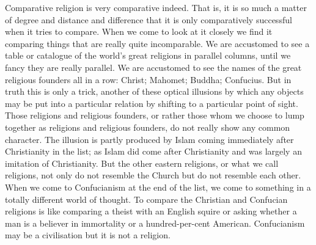 Comparative religion is very comparative indeed. That is, it is so much a matter of degree and distance and difference that it is only comparatively successful when it tries to compare. When we come to look at it closely we find it comparing things that are really quite incomparable. We are accustomed to see a table or catalogue of the world's great religions in parallel columns, until we fancy they are really parallel. We are accustomed to see the names of the great religious founders all in a row: Christ; Mahomet; Buddha; Confucius. But in truth this is only a trick, another of these optical illusions by which any objects may be put into a particular relation by shifting to a particular point of sight. Those religions and religious founders, or rather those whom we choose to lump together as religions and religious founders, do not really show any common character. The illusion is partly produced by Islam coming immediately after Christianity in the list; as Islam did come after Christianity and was largely an imitation of Christianity. But the other eastern religions, or what we call religions, not only do not resemble the Church but do not resemble each other. When we come to Confucianism at the end of the list, we come to something in a totally different world of thought. To compare the Christian and Confucian religions is like comparing a theist with an English squire or asking whether a man is a believer in immortality or a hundred-per-cent American. Confucianism may be a civilisation but it is not a religion.

